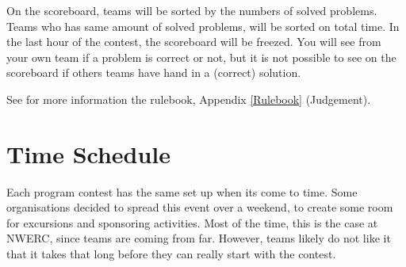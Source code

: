 On the scoreboard, teams will be sorted by the numbers of solved problems. Teams who has same amount of solved problems, will be sorted on total time. In the last hour of the contest, the scoreboard will be freezed. You will see from your own team if a problem is correct or not, but it is not possible to see on the scoreboard if others teams have hand in a (correct) solution.

See for more information the rulebook, Appendix \ref{Rulebook} (Judgement).

\section{Time Schedule}
Each program contest has the same set up when its come to time. Some organisations decided to spread this event over a weekend, to create some room for excursions and sponsoring activities. Most of the time, this is the case at NWERC, since teams are coming from far. However, teams likely do not like it that it takes that long before they can really start with the contest.

